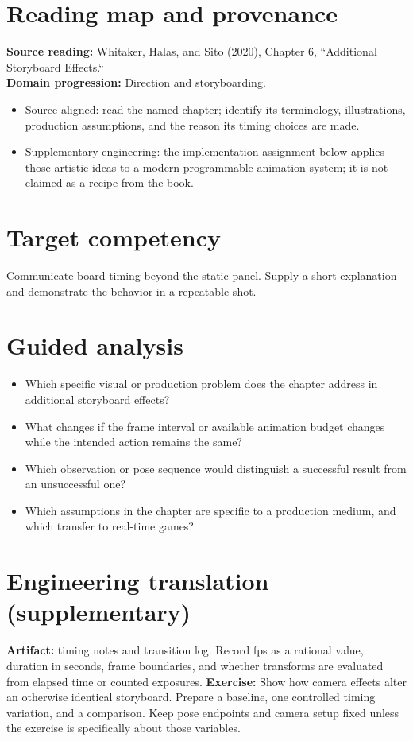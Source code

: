 \documentclass[10pt,letterpaper]{article}
\begin{document}
\makedoctitle
\makedocsummary

\section{Reading map and provenance}
\textbf{Source reading:} Whitaker, Halas, and Sito (2020), Chapter 6, ``Additional Storyboard Effects.``\\
\textbf{Domain progression:} Direction and storyboarding.
\begin{itemize}
\item Source-aligned: read the named chapter; identify its terminology, illustrations, production assumptions, and the reason its timing choices are made.
\item Supplementary engineering: the implementation assignment below applies those artistic ideas to a modern programmable animation system; it is not claimed as a recipe from the book.
\end{itemize}
\section{Target competency}
Communicate board timing beyond the static panel. Supply a short explanation and demonstrate the behavior in a repeatable shot.
\section{Guided analysis}
\begin{itemize}
\item Which specific visual or production problem does the chapter address in additional storyboard effects?
\item What changes if the frame interval or available animation budget changes while the intended action remains the same?
\item Which observation or pose sequence would distinguish a successful result from an unsuccessful one?
\item Which assumptions in the chapter are specific to a production medium, and which transfer to real-time games?
\end{itemize}
\section{Engineering translation (supplementary)}
\textbf{Artifact:} timing notes and transition log. Record fps as a rational value, duration in seconds, frame boundaries, and whether transforms are evaluated from elapsed time or counted exposures.
\textbf{Exercise:} Show how camera effects alter an otherwise identical storyboard. Prepare a baseline, one controlled timing variation, and a comparison. Keep pose endpoints and camera setup fixed unless the exercise is specifically about those variables.
\end{document}
